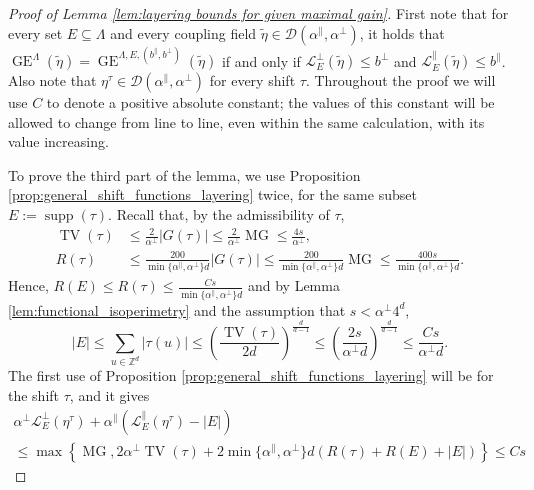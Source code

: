 \documentclass[11pt, reqno]{amsart}
\DeclareMathOperator{\supp}{supp}
\DeclareMathOperator{\GE}{GE}
\DeclareMathOperator{\TV}{TV}
\DeclareMathOperator{\MG}{MG}
\numberwithin{equation}{section}
\begin{document}
\begin{proof} [Proof of Lemma \ref{lem:layering bounds for given maximal gain}]
First note that for every set $E\subseteq\Lambda$ and every coupling field $\tilde{\eta}\in \mathcal{D}(\alpha^{\parallel},\alpha^{\perp})$, 
it holds that $\GE^{\Lambda}(\tilde{\eta})=\GE^{\Lambda,E,(b^{\parallel},b^{\perp})}(\tilde{\eta})$ if and only if 
$\mathcal{L}^{\perp}_{E}(\tilde{\eta})  \leq b^\perp$ and $\mathcal{L}^{\parallel}_{E}(\tilde{\eta})  \leq b^\parallel$.
Also note that $\eta^{\tau}\in\mathcal{D}(\alpha^{\parallel},\alpha^{\perp})$ for every shift $\tau$.
Throughout the proof we will use $C$ to denote a positive absolute constant;
the values of this constant will be allowed to change from line to line, 
even within the same calculation, with its value increasing.

To prove the third part of the lemma, we use Proposition \ref{prop:general_shift_functions_layering} twice, for the same subset $E:=\supp(\tau)$. 
Recall that, by the admissibility of $\tau$,
\begin{align}
\TV(\tau)&\leq \frac{2}{\alpha^{\perp}}\lvert G(\tau)\rvert\leq \frac{2}{\alpha^{\perp}}\MG\leq \frac{4s}{\alpha^{\perp}},\label{eq:TVs}\\
R(\tau)&\leq \frac{200}{\min\{\alpha^{\parallel},\alpha^{\perp}\}d}\lvert G(\tau)\rvert\leq \frac{200}{\min\{\alpha^{\parallel},\alpha^{\perp}\}d}\MG\leq \frac{400 s}{\min\{\alpha^{\parallel},\alpha^{\perp}\}d}.\label{eq:Rs}
\end{align}
Hence, $R(E) \leq R(\tau)\leq \frac{C s}{\min\{\alpha^{\parallel},\alpha^{\perp}\}d}$ and by Lemma \ref{lem:functional_isoperimetry} and the assumption that $s < \alpha^{\perp} 4^d$, 
\begin{equation}\label{eq:Es}
|E|\leq \sum_{u\in{\mathbb Z}^d}\lvert\tau(u)\rvert\leq\left( \frac{\TV(\tau)}{2d}
\right)^{\frac{d}{d-1}}
\leq \left( \frac{2s}{ \alpha^{\perp} d}
\right)^{\frac{d}{d-1}}
\leq \frac{Cs}{ \alpha^{\perp}d}.
\end{equation}
The first use of Proposition \ref{prop:general_shift_functions_layering} will be for the shift $\tau$, and it gives 
\begin{multline*}
\alpha^{\perp} \mathcal{L}^{\perp}_{E}(\eta^{\tau})+\alpha^{\parallel} \left( \mathcal{L}^{\parallel}_{E}(\eta^{\tau}) -|E| \right)\\
\leq \max\left\{ \MG, 2\alpha^{\perp}\TV\left(\tau\right)+2\min \{ \alpha^{\parallel}, \alpha^{\perp} \}d\left(R(\tau)+ R(E)+|E| \right)\right\}\leq C s
\end{multline*}

\end{proof}
\end{document}
